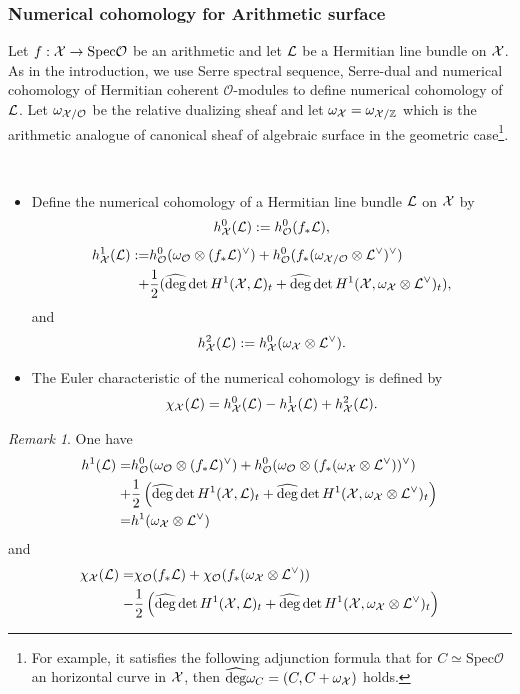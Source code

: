 \documentclass[]{amsart}
\newcommand{\CO}{{\mathcal {O}}} \newcommand{\CP}{{\mathcal {P}}}
\newcommand{\Spec}{{\mathrm{Spec}}} \newcommand{\Spf}{{\mathrm{Spf}}}
\newcommand{\wh}{\widehat}
\newcommand{\ra}{\rightarrow} \newcommand{\imp}{\Longrightarrow}
\theoremstyle{plain}
\theoremstyle{remark} \newtheorem{remark}[thm]{Remark}
\theoremstyle{remark} \newtheorem{exercise}{Exercise}
\theoremstyle{remark} \newtheorem{example}{Example}
\numberwithin{equation}{section}
\begin{document}
\subsubsection{Numerical cohomology for Arithmetic surface}\label{effsur}
Let $f:\CX\ra \Spec\CO$ be an arithmetic and let ${\mathcal {L}}$ be a Hermitian line bundle on ${\mathcal {X}}$. As in the introduction, we use Serre spectral sequence, Serre-dual and numerical cohomology of Hermitian coherent $\CO$-modules to define numerical cohomology of ${\mathcal {L}}$. 
Let $\omega_{\CX/\CO}$ be the relative dualizing sheaf and let $\omega_{{\mathcal {X}}}=\omega_{{\mathcal {X}}/{\mathbb {Z}}}$ which is the arithmetic analogue of canonical sheaf of algebraic surface in the geometric case\footnote{For example, it satisfies the following adjunction formula that for $C\simeq \Spec \CO$ an horizontal curve in ${\mathcal {X}}$, then $\wh{\deg}\omega_{C}=(C,C+\omega_{\CX})$ holds.}.
\begin{defn}\
  \begin{itemize}
    \item [(i)]Define the numerical cohomology of a Hermitian line bundle ${\mathcal {L}}$ on ${\mathcal {X}}$ by 
\[h^0_{\CX}(\CL):=h^0_{\CO}(f_*\CL),\] \[\begin{aligned}h_\CX^1(\CL):=&h_\CO^0(\omega_\CO\otimes (f_*\CL)^\vee)+h_\CO^0(f_*(\omega_{\CX/\CO}\otimes\CL^\vee)^\vee)\\
  +&\frac{1}{2}(\wh{\deg}\det H^1(\CX,\CL)_t+\wh{\deg}\det H^1(\CX,\omega_\CX\otimes\CL^{\vee})_t),\\
\end{aligned}\] and \[h^2_{{\mathcal {X}}}({\mathcal {L}}):=h^0_{{\mathcal {X}}}(\omega_{{\mathcal {X}}}\otimes {\mathcal {L}}^\vee).\]
\item [(ii)]The Euler characteristic of the numerical cohomology is defined by 
\[\chi_{{\mathcal {X}}}({\mathcal {L}})=h^0_{\mathcal {X}}({\mathcal {L}})-h^1_{{\mathcal {X}}}({\mathcal {L}})+h^2_{\mathcal {X}}({\mathcal {L}}).\]
  \end{itemize}


\end{defn}
\begin{remark}
One have \[\begin{aligned}
  h^1(\CL)=&h_\CO^0(\omega_\CO\otimes (f_*\CL)^\vee)+h_\CO^0(\omega_\CO\otimes(f_*(\omega_\CX\otimes\CL^\vee))^\vee)\\
  +&\frac{1}{2}\left(\wh{\deg}\det H^1(\CX,\CL)_t+\wh{\deg}\det H^1(\CX,\omega_\CX\otimes\CL^{\vee})_t\right)\\
=&h^1(\omega_\CX\otimes\CL^\vee)
\end{aligned}\]
and \begin{equation}\label{eu}\begin{aligned}
  \chi_{\CX}(\CL)=&\chi_\CO(f_*\CL)+\chi_\CO(f_*(\omega_\CX\otimes\CL^\vee))\\
  -&\frac{1}{2}\left(\wh{\deg}\det H^1(\CX,\CL)_t+\wh{\deg}\det H^1(\CX,\omega_\CX\otimes\CL^{\vee})_t\right)\end{aligned}
\end{equation}
\end{remark}
\end{document}
